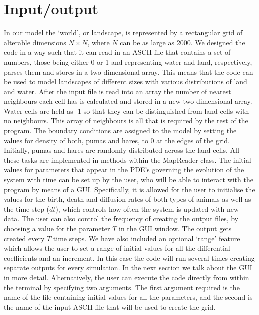 \section{Input/output}
      
      In our model the `world', or landscape, is represented by a rectangular grid of alterable dimensions $N \times N$, where $N$ can be as large as 2000.
      We designed the code in a way such that it can read in an ASCII file that contains a set of numbers, those being either 0 or 1 and representing water and land, respectively, parses them and stores in a two-dimensional array. This means that the code can be used to model landscapes of different sizes with various distributions of land and water. After the input file is read into an array the number of nearest neighbours each cell has is calculated and stored in a new two dimensional array. Water cells are held as -1 so that they can be distinguished from land cells with no neighbours. This array of neighbours is all that is required by the rest of the program.
      \newline{}
      The boundary conditions are assigned to the model by setting the values for density of both, pumas and hares, to 0 at the edges of the grid.  Initially, pumas and hares are randomly distributed across the land cells. 
      All these tasks are implemented in methods within the MapReader class.
      \newline{}
      The initial values for parameters that appear in the PDE's governing the evolution of the system with time can be set up by the user, who will be able to interact with the program by means of a GUI. Specifically, it is allowed for the user to initialise the values for the birth, death and diffusion rates of both types of animals as well as the time step ($dt$), which controls how often the system is updated with new data.  The user can also control the frequency of creating the output files, by choosing a value for the parameter $T$ in the GUI window. The output gets created every $T$ time steps. We have also included an optional `range' feature which allows the user to set a range of initial values for all the differential coefficients and an increment. In this case the code will run several times creating separate outputs for every simulation. In the next section we talk about the GUI in more detail. 
      \newline{}
      Alternatively, the user can execute the code directly from within the terminal by specifying two arguments. The first argument required is the name of the file containing initial values for all the parameters, and the second is the name of the input ASCII file that will be used to create the grid. 
      \newline{}
      \newline{}
      

